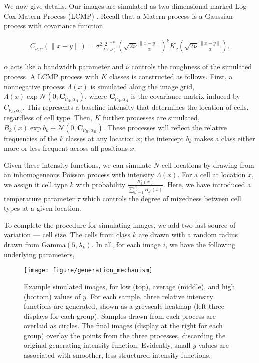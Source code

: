 We now give details. Our images are simulated as two-dimensional marked Log Cox
Matern Process (LCMP) \cite{diggle2013}. Recall that a Matern process is a
Gaussian process with covariance function

\begin{align*}
C_{\nu, \alpha}(\|x - y\|)=\sigma^{2} \frac{2^{1-\nu}}{\Gamma(\nu)}\left(\sqrt{2 \nu} \frac{\|x - y\|}{\alpha}\right)^{\nu} K_{\nu}\left(\sqrt{2 \nu} \frac{\|x - y\|}{\alpha}\right).
\end{align*}

$\alpha$ acts like a bandwidth parameter and $\nu$ controls the roughness of the
simulated process. A LCMP process with $K$ classes is constructed as follows.
First, a nonnegative process $\Lambda\left(x\right)$ is simulated along the
image grid, $\Lambda\left(x\right) \exp{\mathcal{N}\left(0,
  \mathbf{C}_{\nu_{\Lambda}, \alpha_{\Lambda}}\right)}$, where
$\mathbf{C}_{\nu_{\Lambda}, \alpha_{\Lambda}}$ is the covariance matrix induced
by $C_{\nu_{\Lambda}, \alpha_{\Lambda}}$. This represents a baseline intensity
that determines the location of cells, regardless of cell type. Then, $K$
further processes are simulated, $B_{k}\left(x\right) \exp{b_{k} +
  \mathcal{N}\left(0, \mathbf{C}_{\nu_{B}, \alpha_{B}}\right)} $. These
processes will reflect the relative frequencies of the $k$ classes at any
location $x$; the intercept $b_k$ makes a class either more or less frequent
across all positions $x$.

Given these intensity functions, we can simulate $N$ cell locations by drawing
from an inhomogeneous Poisson process with intensity $\Lambda\left(x\right)$.
For a cell at location $x$, we assign it cell type $k$ with probability
$\frac{B_{k}^{\tau}\left(x\right)}{\sum_{k^\prime = 1}^{K}
  B^{\tau}_{k^\prime}\left(x\right)}$. Here, we have introduced a temperature
parameter $\tau$ which controls the degree of mixedness between cell types at a
given location.

To complete the procedure for simulating images, we add two last source of
variation — cell size. The cells from class $k$ are drawn with a random radius
drawn from $\text{Gamma}\left(5, \lambda_{k}\right)$. In all, for each image
$i$, we have the following underlying parameters,

\begin{figure}
  \centering
  \texttt{[image: figure/generation\_mechanism]}
  \caption{Example simulated images, for low (top), average (middle), and high
    (bottom) values of $y$. For each sample, three relative intensity functions
    are generated, shown as a greyscale heatmap (left three displays for each
    group). Samples drawn from each process are overlaid as circles. The final
    images (display at the right for each group) overlay the points from the
    three processes, discarding the original generating intensity function.
    Evidently, small $y$ values are associated with smoother, less structured
    intensity functions.}
\end{figure}

